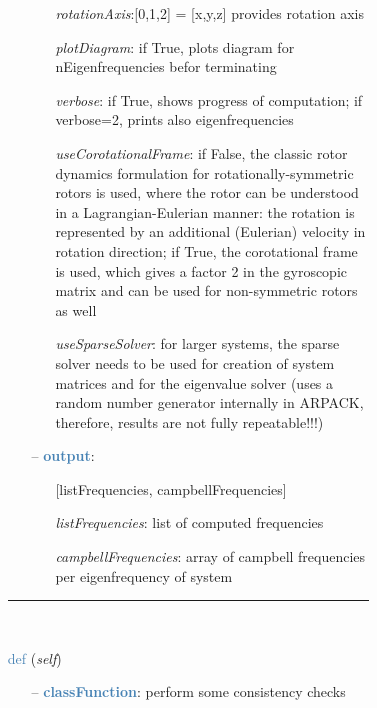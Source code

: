 \begin{itemize}[leftmargin=1.4cm]
\begin{itemize}[leftmargin=1.4cm]
\begin{itemize}[leftmargin=0.5cm]
\begin{itemize}[leftmargin=1.4cm]
\begin{itemize}[leftmargin=1.4cm]
\begin{itemize}[leftmargin=0.5cm]
\begin{itemize}[leftmargin=0.7cm]
\begin{itemize}[leftmargin=1.2cm]
\item[]{\it rotationAxis}:[0,1,2] = [x,y,z] provides rotation axis
\item[]{\it plotDiagram}: if True, plots diagram for nEigenfrequencies befor terminating
\item[]{\it verbose}: if True, shows progress of computation; if verbose=2, prints also eigenfrequencies
\item[]{\it useCorotationalFrame}: if False, the classic rotor dynamics formulation for rotationally-symmetric rotors is used, where the rotor can be understood in a Lagrangian-Eulerian manner: the rotation is represented by an additional (Eulerian) velocity in rotation direction; if True, the corotational frame is used, which gives a factor 2 in the gyroscopic matrix and can be used for non-symmetric rotors as well
\item[]{\it useSparseSolver}: for larger systems, the sparse solver needs to be used for creation of system matrices and for the eigenvalue solver (uses a random number generator internally in ARPACK, therefore, results are not fully repeatable!!!)
\end{itemize}
\item[--]\textcolor{steelblue}{\bf output}: \vspace{-6pt}
\begin{itemize}[leftmargin=1.2cm]
\setlength{\itemindent}{-0.7cm}
\item[][listFrequencies, campbellFrequencies]
\item[]{\it listFrequencies}: list of computed frequencies
\item[]{\it campbellFrequencies}: array of campbell frequencies per eigenfrequency of system
\end{itemize}
\vspace{12pt}\end{itemize}
%
\noindent\rule{8cm}{0.75pt}\vspace{1pt} \\ 
\begin{flushleft}
\noindent \textcolor{steelblue}{def {\bf {}}}\label{sec:FEM:FEMinterface:CheckConsistency}
({\it self})
\end{flushleft}
\setlength{\itemindent}{0.7cm}
\begin{itemize}[leftmargin=0.7cm]
\item[--]\textcolor{steelblue}{\bf classFunction}: perform some consistency checks
\vspace{12pt}\end{itemize}

\end{itemize}
\end{itemize}
\end{itemize}
\end{itemize}
\end{itemize}
\end{itemize}
